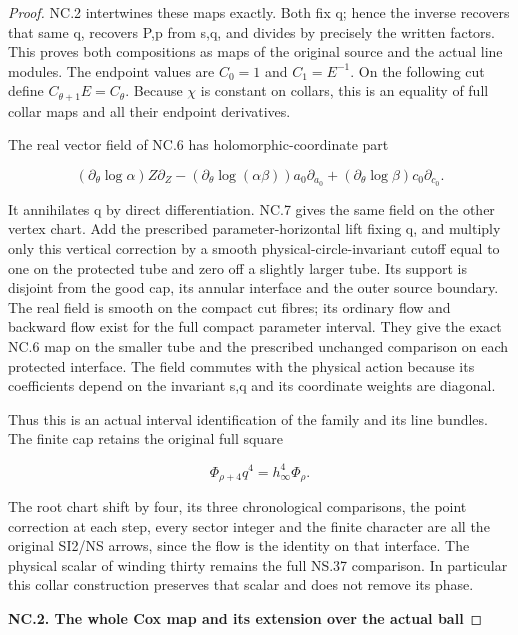 \begin{proof}
NC.2 intertwines these maps exactly. Both fix q; hence the inverse
recovers that same q, recovers P,p from s,q, and divides by precisely
the written factors. This proves both compositions as maps of the
original source and the actual line modules. The endpoint values are
\(C_{0}=1\) and \(C_{1}=E^{-1}\). On the following cut define \(C_{\theta+1} E=C_\theta\).
Because \(\chi\) is constant on collars, this is an equality of full
collar maps and all their endpoint derivatives.

The real vector field of NC.6 has holomorphic-coordinate part

\[
 (\partial_\theta\log\alpha)Z\partial_Z
 -(\partial_\theta\log(\alpha\beta))a_0\partial_{a_0}
 +(\partial_\theta\log\beta)c_0\partial_{c_0}.            \tag{NC.8}
\]

It annihilates q by direct differentiation. NC.7 gives the same field
on the other vertex chart. Add the prescribed parameter-horizontal
lift fixing q, and multiply only this vertical correction by a smooth
physical-circle-invariant cutoff equal to one on the protected tube
and zero off a slightly larger tube. Its support is disjoint from the
good cap, its annular interface and the outer source boundary. The
real field is smooth on the compact cut fibres; its ordinary flow and
backward flow exist for the full compact parameter interval. They
give the exact NC.6 map on the smaller tube and the prescribed
unchanged comparison on each protected interface. The field commutes
with the physical action because its coefficients depend on the
invariant s,q and its coordinate weights are diagonal.

Thus this is an actual interval identification of the family and its
line bundles. The finite cap retains the original full square

\[
                     \Phi_{\rho+4}q^4=h_\infty^4\Phi_\rho.
                                                        \tag{NC.9}
\]

The root chart shift by four, its three chronological comparisons,
the point correction at each step, every sector integer and the
finite character are all the original SI2/NS arrows, since the flow
is the identity on that interface. The physical scalar of winding
thirty remains the full NS.37 comparison. In particular this collar
construction preserves that scalar and does not remove its phase.

\par

\medskip\noindent\textbf{NC.2. The whole Cox map and its extension over the actual ball}


\end{proof}
